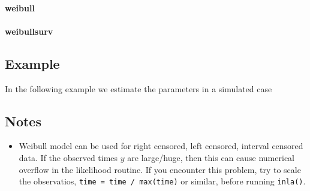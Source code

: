 \documentclass[a4paper,11pt]{article}
\begin{document}
\paragraph{weibull}
\begin{quote}
    
\end{quote}
\paragraph{weibullsurv}
\begin{quote}
    
\end{quote}

\subsection*{Example}

In the following example we estimate the parameters in a simulated
case 

\subsection*{Notes}

\begin{itemize}
\item Weibull model can be used for right censored, left censored,
    interval censored data. If the observed times $y$ are large/huge,
    then this can cause numerical overflow in the likelihood routine.
    If you encounter this problem, try to scale the observatios,
    \verb|time = time / max(time)| or similar, before running
    \verb|inla()|.
\end{itemize}
\end{document}
